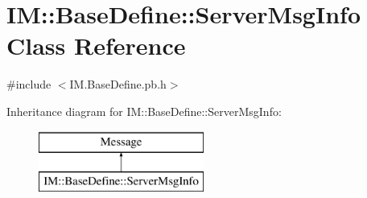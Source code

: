 \hypertarget{class_i_m_1_1_base_define_1_1_server_msg_info}{}\section{I\+M\+:\+:Base\+Define\+:\+:Server\+Msg\+Info Class Reference}
\label{class_i_m_1_1_base_define_1_1_server_msg_info}


{\ttfamily \#include $<$I\+M.\+Base\+Define.\+pb.\+h$>$}

Inheritance diagram for I\+M\+:\+:Base\+Define\+:\+:Server\+Msg\+Info\+:\begin{figure}[H]
\begin{center}
\leavevmode
\includegraphics[height=2.000000cm]{class_i_m_1_1_base_define_1_1_server_msg_info}
\end{center}
\end{figure}
